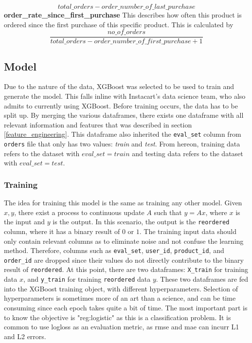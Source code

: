 \documentclass[12pt]{article}
\begin{document}
\begin{equation}
    total\_orders - order\_number\_of\_last\_purchase
\end{equation}
\newline\newline
{\textbf{order\_rate\_since\_first\_purchase}}
\newline
This describes how often this product is ordered since the first purchase of this specific product. This is calculated by
\begin{equation}
    \frac{no\_of\_orders}{total\_orders - order\_number\_of\_first\_purchase + 1}
\end{equation}

\subsection{Model}
Due to the nature of the data, XGBoost was selected to be used to train and generate the model. This falls inline with Instacart's data science team, who also admits to currently using XGBoost. 
\newline\newline
Before training occurs, the data has to be split up. By merging the various dataframes, there exists one dataframe with all relevant information and features that was described in section \ref{feature_engineering}. This dataframe also inherited the \texttt{eval\_set} column from \texttt{orders} file that only has two values: \textit{train} and \textit{test}. From hereon, training data refers to the dataset with $eval\_set = train$ and testing data refers to the dataset with $eval\_set = test$.

\subsubsection{Training}
The idea for training this model is the same as training any other model. Given $x, y$, there exist a process to continuous update $A$ such that $y = Ax$, where $x$ is the input and $y$ is the output. In this scenario, the output is the \texttt{reordered} column, where it has a binary result of $0$ or $1$. The training input data should only contain relevant columns as to eliminate noise and not confuse the learning method. Therefore, columns such as \texttt{eval\_set}, \texttt{user\_id}, \texttt{product\_id}, and \texttt{order\_id} are dropped since their values do not directly contribute to the binary result of \texttt{reordered}.
\newline\newline
At this point, there are two dataframes: \texttt{X\_train} for training data $x$, and \texttt{y\_train} for training \texttt{reordered} data $y$. These two dataframes are fed into the XGBoost training object, with different hyperparameters. Selection of hyperparameters is sometimes more of an art than a science, and can be time consuming since each epoch takes quite a bit of time. The most important part is to know the objective is "reg:logistic" as this is a classification problem. It is common to use logloss as an evaluation metric, as rmse and mae can incurr L1 and L2 errors.
\end{document}
